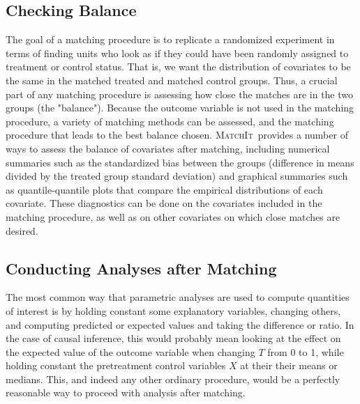 \documentclass[oneside,letterpaper,titlepage]{article}
\newcommand{\MatchIt}{\textsc{MatchIt}}
\begin{document}
\subsection{Checking Balance}

The goal of a matching procedure is to replicate a randomized experiment in terms of finding units who look
as if they could have been randomly assigned to treatment or control status.  That is, we want the distribution
of covariates to be the same in the matched treated and matched control groups. Thus, a crucial part of any 
matching procedure is assessing how close the matches are in the two groups (the "balance").  Because the outcome variable
is not used in the matching procedure, a variety of matching methods can be assessed, and the matching procedure that leads to the
best balance chosen.  \MatchIt\ provides a number of ways to assess the balance of covariates after matching, including
numerical summaries such as the standardized bias between the groups (difference in means divided by the treated group standard
deviation) and graphical summaries such as quantile-quantile plots that compare the empirical distributions of each covariate.  
These diagnostics can be done on the covariates included in the matching procedure, as well as on other covariates on which
close matches are desired.  

\subsection{Conducting Analyses after Matching}

The most common way that parametric analyses are used to compute
quantities of interest is by holding constant some explanatory
variables, changing others, and computing predicted or expected values
and taking the difference or ratio.  In the case of causal inference,
this would probably mean looking at the effect on the expected value
of the outcome variable when changing $T$ from 0 to 1, while holding
constant the pretreatment control variables $X$ at their their means
or medians.  This, and indeed any other ordinary procedure, would be a
perfectly reasonable way to proceed with analysis after matching.
\end{document}
